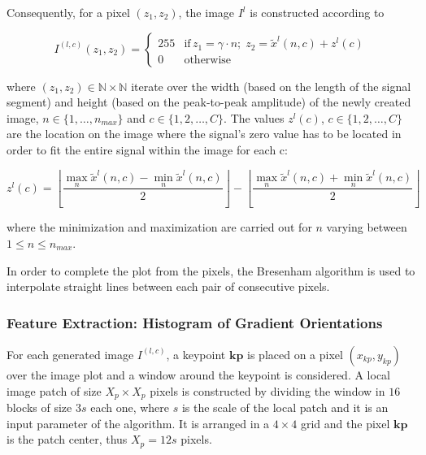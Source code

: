 \documentclass[utf8]{frontiersSCNS} %
\begin{document}
Consequently, for a pixel $(z_1,z_2)$, the image $I^l$ is constructed according to

\begin{equation}
I^{(l,c)}(z_1,z_2) = \left\{ \begin{array}{rl}
255 & \text{if} \,  z_1 = \gamma \cdot n; \; z_2 = \tilde{x}^l(n,c) + z^l(c) \\
0   & \mbox{otherwise}
\end{array}\right.
\label{eq:images}
\end{equation}

\noindent where $ (z_1,z_2) \in \mathbb{N} \times \mathbb{N}$ iterate over the width (based on the length of the signal segment) and height (based on the peak-to-peak amplitude) of the newly created image,  $n \in \{1, \dots, n_{max}\}$ and $c \in \{1,2,\dots,C\}$.  The values $z^l(c)$, $c \in \{1,2,\dots,C\}$ are the location on the image where the signal's zero value has to be located in order to fit the entire signal within the image for each c:

\begin{equation}
z^l(c) = \left \lfloor{ \frac{\max_{n} \tilde{x}^l(n,c)  - \min_{n} \tilde{x}^l(n,c) }{2} }\right \rfloor -   \left \lfloor{ \frac{\max_{n} \tilde{x}^l(n,c)  + \min_{n} \tilde{x}^l(n,c)}{ 2} }\right \rfloor
\label{eq:zerolevel}
\end{equation}

\noindent where the minimization and maximization are carried out for $n$ varying between ${1 \leq n\leq n_{max}}$.
  
In order to complete the plot from the pixels, the Bresenham \citep{Bresenham1965,Ramele2016} algorithm is used to interpolate straight lines between each pair of  consecutive pixels.


\subsubsection{Feature Extraction: Histogram of Gradient Orientations}
\label{SIFT}


For each generated image $I^{(l,c)}$, a keypoint $\mathbf{kp}$ is placed on a pixel $(x_{kp}, y_{kp})$ over the image plot and a window around the keypoint is considered. A local image patch of size $X_p \times X_p$ pixels is constructed by dividing the window in $16$ blocks of size $3s$ each one,  where $s$ is the scale of the local patch and it is an input parameter of the algorithm. It is arranged in a $4 \times 4$ grid and the pixel $ \mathbf{kp}$ is the patch center, thus $X_p = 12s $ pixels. 
\end{document}
